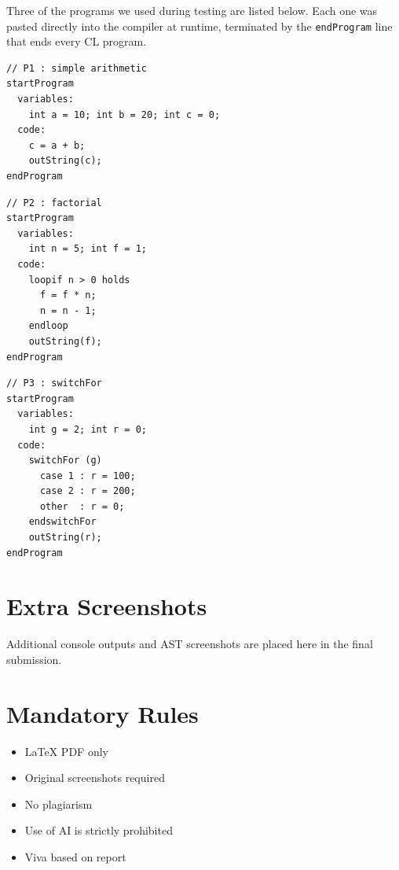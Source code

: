 \documentclass[12pt,a4paper]{report}
\begin{document}
Three of the programs we used during testing are listed below. Each one was pasted directly into the compiler at runtime, terminated by the \texttt{endProgram} line that ends every CL program.

\begin{verbatim}
// P1 : simple arithmetic
startProgram
  variables:
    int a = 10; int b = 20; int c = 0;
  code:
    c = a + b;
    outString(c);
endProgram
\end{verbatim}

\begin{verbatim}
// P2 : factorial
startProgram
  variables:
    int n = 5; int f = 1;
  code:
    loopif n > 0 holds
      f = f * n;
      n = n - 1;
    endloop
    outString(f);
endProgram
\end{verbatim}

\begin{verbatim}
// P3 : switchFor
startProgram
  variables:
    int g = 2; int r = 0;
  code:
    switchFor (g)
      case 1 : r = 100;
      case 2 : r = 200;
      other  : r = 0;
    endswitchFor
    outString(r);
endProgram
\end{verbatim}

\chapter{Extra Screenshots}

Additional console outputs and AST screenshots are placed here in the final submission.

\chapter*{Mandatory Rules}

\begin{itemize}
\item LaTeX PDF only
\item Original screenshots required
\item No plagiarism
\item Use of AI is strictly prohibited
\item Viva based on report
\end{itemize}
\end{document}
